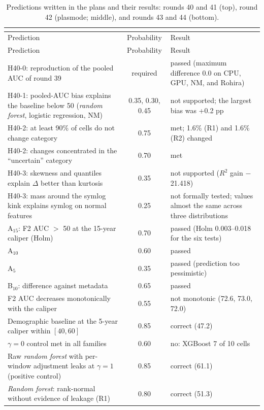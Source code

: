 {\scriptsize
\begin{longtable}{p{}cp{}}
\caption{Predictions written in the plans and their results: rounds 40 and 41 (top), round 42 (plasmode; middle), and rounds 43 and 44 (bottom).}\label{tab:s2_pred1}\label{tab:s2_pred2}\label{tab:s2_pred3}\\
\toprule
Prediction & Probability & Result \\
\midrule
\endfirsthead
\toprule
Prediction & Probability & Result \\
\midrule
\endhead
\bottomrule
\endfoot
H40-0: reproduction of the pooled AUC of round 39 & required & passed (maximum difference 0.0 on CPU, GPU, NM, and Rohira) \\
H40-1: pooled-AUC bias explains the baseline below 50 (\textit{random forest}, logistic regression, NM) & 0.35, 0.30, 0.45 & not supported; the largest bias was +0.2 pp \\
H40-2: at least 90\% of cells do not change category & 0.75 & met; 1.6\% (R1) and 1.6\% (R2) changed \\
H40-2: changes concentrated in the ``uncertain'' category & 0.70 & met \\
H40-3: skewness and quantiles explain $\Delta$ better than kurtosis & 0.35 & not supported ($R^2$ gain $-$21.418) \\
H40-3: mass around the symlog kink explains symlog on normal features & 0.25 & not formally tested; values almost the same across three distributions \\
\midrule
A$_{15}$: F2 AUC $>$ 50 at the 15-year caliper (Holm) & 0.70 & passed (Holm 0.003--0.018 for the six tests) \\
A$_{10}$ & 0.60 & passed \\
A$_{5}$ & 0.35 & passed (prediction too pessimistic) \\
B$_{10}$: difference against metadata & 0.65 & passed \\
F2 AUC decreases monotonically with the caliper & 0.55 & not monotonic (72.6, 73.0, 72.0) \\
Demographic baseline at the 5-year caliper within $[40, 60]$ & 0.85 & correct (47.2) \\
\midrule
$\gamma=0$ control met in all families & 0.60 & no: XGBoost 7 of 10 cells \\
Raw \textit{random forest} with per-window adjustment leaks at $\gamma=1$ (positive control) & 0.85 & correct (61.1) \\
\textit{Random forest}: rank-normal without evidence of leakage (R1) & 0.80 & correct (51.3) \\

\end{longtable}}
